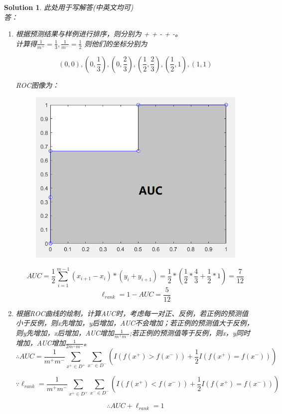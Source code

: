\documentclass[a4paper,UTF8]{article}
\numberwithin{equation}{section}
\newtheorem*{mySol}{Solution}
\begin{document}
\begin{mySol}
此处用于写解答(中英文均可)
~\\
答：\\

\begin{enumerate}[ {(}1{)}]
\item 
	根据预测结果与样例进行排序，则分别为 + + - + -。\\
	计算得$\frac{1}{m^+}=\frac{1}{3},\frac{1}{m^-}=\frac{1}{2}$
	则他们的坐标分别为
	
	\begin{equation}
	(0,0),
	(0,\frac{1}{3}),
	(0,\frac{2}{3}),
	(\frac{1}{2},\frac{2}{3}),
	(\frac{1}{2},1),
	(1,1)
	\end{equation}
	
	ROC图像为：\\
	
	\begin{figure}[H]
	\begin{center}
		\includegraphics[width=0.32\linewidth]{roc.png}
	\end{center}
	\vspace{-0.5em}
	\end{figure}
	
	\[
		AUC=\frac{1}{2}\sum^{m-1}_{i=1}{(x_{i+1}-x_i)*(y_i+y_{i+1})}
		=\frac{1}{2}*(\frac{1}{2}*\frac{4}{3}+\frac{1}{2}*1)
		=\frac{7}{12}		
	\] 
	\[\ell_{rank}=1-AUC=\frac{5}{12}\]
	
\item
	根据ROC曲线的绘制，计算AUC时，考虑每一对正、反例，若正例的预测值小于反例，则x先增加，y后增加，AUC不会增加；若正例的预测值大于反例，则y先增加，x后增加，AUC增加$\frac{1}{m^+m^-}$;若正例的预测值等于反例，则x，y同时增加，AUC增加$\frac{1}{2m^+m^-}$。\\
	
	\[
	\therefore AUC=\frac{1}{m^+m^-}\sum_{x^+ \in D^+}\sum_{x^- \in D^-}(I(f(x^+)>f(x^-))+\frac{1}{2}I(f(x^+)=f(x^-)))
	\]
	
	\[
	\because \ell_{rank}=\frac{1}{m^+m^-}\sum_{x^+ \in D^+}\sum_{x^- \in D^-}(I(f(x^+)<f(x^-))+\frac{1}{2}I(f(x^+)=f(x^-)))
	\]
	
	\[\therefore AUC+\ell_{rank}=1 \]
	
\end{enumerate}

\end{mySol}
\end{document}

